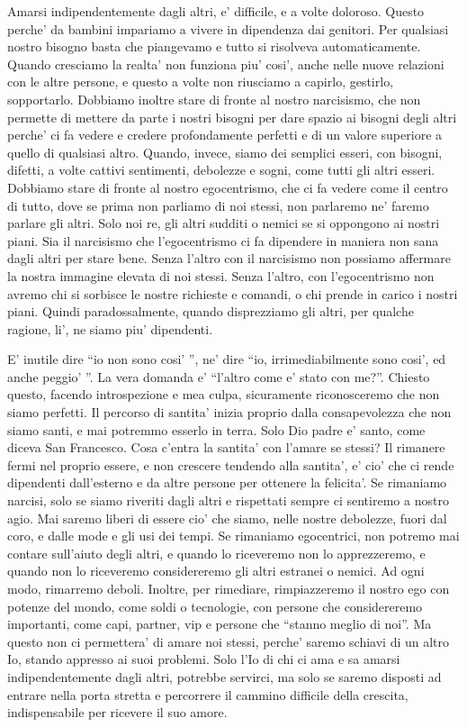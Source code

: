 Amarsi indipendentemente dagli altri, e' difficile, e a volte doloroso. Questo perche' da bambini impariamo a vivere in dipendenza dai genitori. Per qualsiasi nostro bisogno basta che piangevamo e tutto si risolveva automaticamente. Quando cresciamo la realta' non funziona piu' cosi', anche nelle nuove relazioni con le altre persone, e questo a volte non riusciamo a capirlo, gestirlo, sopportarlo. Dobbiamo inoltre stare di fronte al nostro narcisismo, che non permette di mettere da parte i nostri bisogni per dare spazio ai bisogni degli altri perche' ci fa vedere e credere profondamente perfetti e di un valore superiore a quello di qualsiasi altro. Quando, invece, siamo dei semplici esseri, con bisogni, difetti, a volte cattivi sentimenti, debolezze e sogni, come tutti gli altri esseri. Dobbiamo stare di fronte al nostro egocentrismo, che ci fa vedere come il centro di tutto, dove se prima non parliamo di noi stessi, non parlaremo ne' faremo parlare gli altri. Solo noi re, gli altri sudditi o nemici se si oppongono ai nostri piani. Sia il narcisismo che l'egocentrismo ci fa dipendere in maniera non sana dagli altri per stare bene. Senza l'altro con il narcisismo non possiamo affermare la nostra immagine elevata di noi stessi. Senza l'altro, con l'egocentrismo non avremo chi si sorbisce le nostre richieste e comandi, o chi prende in carico i nostri piani. Quindi paradossalmente, quando disprezziamo gli altri, per qualche ragione, li', ne siamo piu' dipendenti.

E' inutile dire ``io non sono cosi' '', ne' dire ``io, irrimediabilmente sono cosi', ed anche peggio' ''. La vera domanda e' ``l'altro come e' stato con me?''. Chiesto questo, facendo introspezione e mea culpa, sicuramente riconosceremo che non siamo perfetti. Il percorso di santita' inizia proprio dalla consapevolezza che non siamo santi, e mai potremmo esserlo in terra. Solo Dio padre e' santo, come diceva San Francesco. 
Cosa c'entra la santita' con l'amare se stessi? Il rimanere fermi nel proprio essere, e non crescere tendendo alla santita', e' cio' che ci rende dipendenti dall'esterno e da altre persone per ottenere la felicita'. Se rimaniamo narcisi, solo se siamo riveriti dagli altri e rispettati sempre ci sentiremo a nostro agio. Mai saremo liberi di essere cio' che siamo, nelle nostre debolezze, fuori dal coro, e dalle mode e gli usi dei tempi. Se rimaniamo egocentrici, non potremo mai contare sull'aiuto degli altri, e quando lo riceveremo non lo apprezzeremo, e quando non lo riceveremo considereremo gli altri estranei o nemici. Ad ogni modo, rimarremo deboli. Inoltre, per rimediare, rimpiazzeremo il nostro ego con potenze del mondo, come soldi o tecnologie, con persone che considereremo importanti, come capi, partner, vip e persone che ``stanno meglio di noi''. Ma questo non ci permettera' di amare noi stessi, perche' saremo schiavi di un altro Io, stando appresso ai suoi problemi. Solo l'Io di chi ci ama e sa amarsi indipendentemente dagli altri, potrebbe servirci, ma solo se saremo disposti ad entrare nella porta stretta e percorrere il cammino difficile della crescita, indispensabile per ricevere il suo amore.


